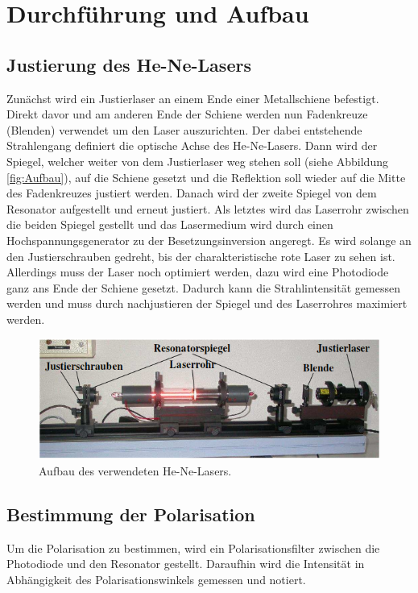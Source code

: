 \section{Durchführung und Aufbau}
\label{sec:Durchführung}

\subsection{Justierung des He-Ne-Lasers}
Zunächst wird ein Justierlaser an einem Ende einer Metallschiene befestigt. Direkt davor und am anderen Ende der Schiene werden nun Fadenkreuze (Blenden) verwendet um den Laser auszurichten. Der dabei entstehende Strahlengang definiert die optische Achse des He-Ne-Lasers. Dann wird der Spiegel, welcher weiter von dem Justierlaser weg stehen soll (siehe Abbildung \eqref{fig:Aufbau}), auf die Schiene gesetzt und die Reflektion soll wieder auf die Mitte des Fadenkreuzes justiert werden. Danach wird der zweite Spiegel von dem Resonator aufgestellt und erneut justiert. Als letztes wird das Laserrohr zwischen die beiden Spiegel gestellt und das Lasermedium wird durch einen Hochspannungsgenerator zu der Besetzungsinversion angeregt. Es wird solange an den Justierschrauben gedreht, bis der charakteristische rote Laser zu sehen ist. Allerdings muss der Laser noch optimiert werden, dazu wird eine Photodiode ganz ans Ende der Schiene gesetzt. Dadurch kann die Strahlintensität gemessen werden und muss durch nachjustieren der Spiegel und des Laserrohres maximiert werden.

\begin{figure}[H]
  \includegraphics[width=\linewidth]{Bilder/Aufbau.png}
  \caption{Aufbau des verwendeten He-Ne-Lasers. \cite{V61}}
  \label{fig:Aufbau}
\end{figure}

\subsection{Bestimmung der Polarisation}
Um die Polarisation zu bestimmen, wird ein Polarisationsfilter zwischen die Photodiode und den Resonator gestellt. Daraufhin wird die Intensität in Abhängigkeit des Polarisationswinkels gemessen und notiert.

